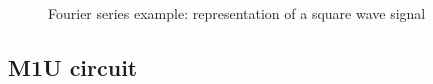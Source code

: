 \begin{frame}
\begin{figure}
        
        \caption{Fourier series example: representation of a square wave signal}
        \label{fig:Fourier_series_square_wave}
    \end{figure}
\end{frame}

\subsection{M1U circuit} 

